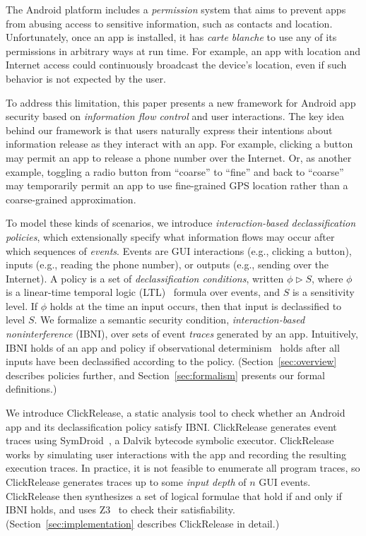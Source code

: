 \documentclass{llncs}
\newcommand{\toolname}{ClickRelease\xspace}
\begin{document}
The Android platform includes a \emph{permission} system that aims to
prevent apps from abusing access to sensitive information, such as
contacts and location. Unfortunately, once an app is installed, it has
\emph{carte blanche} to use any of its permissions in arbitrary ways
at run time. For example, an app with location and Internet access
could continuously broadcast the device's location, even if such
behavior is not expected by the user.

To address this limitation, this paper presents a new framework for
Android app security based on \emph{information flow control}
\cite{Denning:1975} and user interactions.  The key idea behind our framework
is that users naturally express their intentions about information
release as they interact with an app.  For example,
clicking a button may permit an app to release a phone number over the
Internet. Or, as another example,
toggling a radio button from ``coarse'' to ``fine'' and back to
``coarse'' may temporarily permit an app to use fine-grained GPS
location rather than a coarse-grained approximation.

To model these kinds of scenarios, we introduce
\emph{interaction-based declassification policies}, which
extensionally specify what information flows may occur after which
sequences of \emph{events}.  Events are GUI interactions (e.g.,
clicking a button), inputs (e.g., reading
the phone number), or outputs (e.g., sending over the Internet).
A policy is a set of \emph{declassification conditions}, written
$\phi \mathrel\rhd S$, where $\phi$ is a linear-time temporal logic
(LTL)~\cite{Pnueli:1977} formula over events, and $S$ is a sensitivity
level.  If $\phi$ holds at the time an input occurs, then that input
is declassified to level $S$. 
We formalize a semantic security condition,
\emph{interaction-based noninterference} (IBNI), over sets of event
\emph{traces} generated by an app.  Intuitively, IBNI holds of an app
and policy if observational
determinism~\cite{Zdancewic:03} holds after all inputs have been
declassified according to the policy. 
(Section~\ref{sec:overview}
describes policies further, and Section~\ref{sec:formalism} presents
our formal definitions.)

We introduce \toolname, a static analysis tool to check
whether an Android app and its declassification policy
satisfy IBNI.
\toolname generates event traces using SymDroid~\cite{Jeon:2012}, a
Dalvik bytecode symbolic executor.  \toolname
works by simulating user interactions with the app and recording the
resulting execution traces.
In practice, it is not feasible to
enumerate all program traces, so \toolname generates traces up to some
\emph{input depth} of $n$ GUI events.  
\toolname{} then synthesizes a
set of logical formulae that hold if and only if IBNI holds, and uses
Z3~\cite{deMoura:2008} to check their satisfiability.
(Section~\ref{sec:implementation} describes \toolname in detail.)
\end{document}

